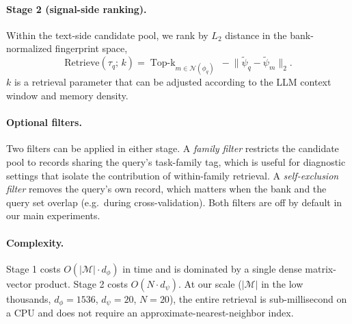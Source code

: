 \paragraph{Stage 2 (signal-side ranking).}
Within the text-side candidate pool, we rank by $L_2$ distance in the
bank-normalized fingerprint space,
\begin{equation}
    \mathrm{Retrieve}(\tau_q;\, k)
    = \!\!\mathop{\mathrm{Top\text{-}}k}_{m \in \mathcal{N}(\phi_q)}\
    -\big\| \tilde\psi_q - \tilde\psi_m \big\|_2.
\end{equation}
$k$ is a retrieval parameter that can be adjusted according to the LLM context window and memory density.

\paragraph{Optional filters.}
Two filters can be applied in either stage. A \emph{family filter}
restricts the candidate pool to records sharing the query's task-family
tag, which is useful for diagnostic settings that isolate the
contribution of within-family retrieval. A \emph{self-exclusion filter}
removes the query's own record, which matters when the bank and the
query set overlap (e.g.\ during cross-validation). Both filters are
off by default in our main experiments.

\paragraph{Complexity.}
Stage 1 costs $O(|\mathcal{M}| \cdot d_\phi)$ in time and is dominated
by a single dense matrix-vector product. Stage 2 costs
$O(N \cdot d_\psi)$. At our scale ($|\mathcal{M}|$ in the low
thousands, $d_\phi = 1536$, $d_\psi = 20$, $N = 20$), the entire
retrieval is sub-millisecond on a CPU and does not require an
approximate-nearest-neighbor index.